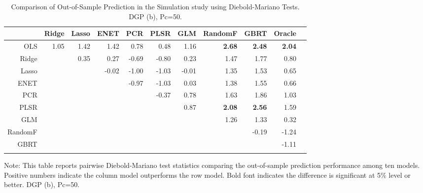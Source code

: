 \documentclass[11pt]{article}
\begin{document}
\begin{table}[H]
\begin{threeparttable}
\centering
\setlength{\tabcolsep}{5pt}
\caption{Comparison of Out-of-Sample Prediction in the Simulation study using Diebold-Mariano Tests. DGP (b), Pc=50.}
\centering
\begin{tabular}{r|rrrrrrrrrr}
  \Xhline{2\arrayrulewidth}
& Ridge & Lasso & ENET & PCR & PLSR & GLM & RandomF & GBRT & Oracle \\ 
  \hline
OLS  & 1.05 & 1.42 & 1.42 & 0.78 & 0.48 & 1.16 & \textbf{2.68} & \textbf{2.48} & \textbf{2.04} \\ 
  Ridge & & 0.35 & 0.27 & -0.69 & -0.80 & 0.23 & 1.47 & 1.77 & 0.80 \\ 
  Lasso && & -0.02 & -1.00 & -1.03 & -0.01 & 1.35 & 1.53 & 0.65 \\ 
  ENET &&& & -0.97 & -1.03 & 0.03 & 1.38 & 1.55 & 0.66 \\ 
  PCR &&&& & -0.37 & 0.78 & 1.63 & 1.86 & 1.03 \\ 
  PLSR &&&&&& 0.87 & \textbf{2.08} & \textbf{2.56} & 1.59 \\ 
  GLM&&&&&& & 1.26 & 1.33 & 0.32 \\ 
  RandomF &&&&&&& & -0.19 & -1.24 \\ 
  GBRT &&&&&&&& & -1.11 \\ 
   \Xhline{2\arrayrulewidth}
\end{tabular}
\begin{tablenotes}
      \small
      \item Note: This table reports pairwise Diebold-Mariano test statistics comparing the out-of-sample prediction performance among ten models. Positive numbers indicate the column model outperforms the row model. Bold font indicates the difference is significant at 5\% level or better. DGP (b), Pc=50.
    \end{tablenotes}
  \end{threeparttable}
\label{table:dieboldsim3}
\end{table}


\end{document}

